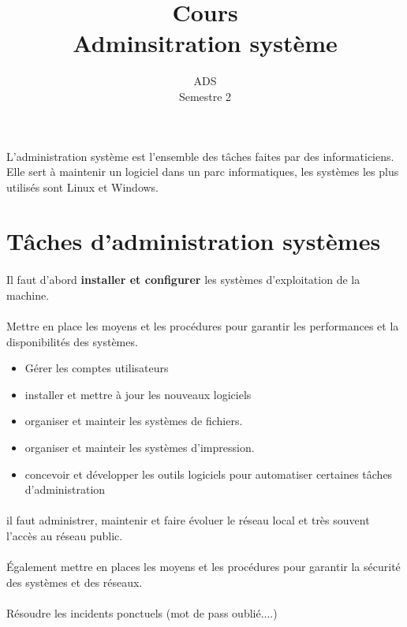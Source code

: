\documentclass[12pt,a4paper,openany]{book}
\title{Cours\\ Adminsitration système}
\date{ADS\\ Semestre 2}
\begin{document}
	\maketitle
	L'administration système est l'ensemble des tâches faites par des informaticiens.
	Elle sert à maintenir un logiciel dans un parc informatiques, les systèmes les 
	plus utilisés sont Linux et Windows.

	\section{Tâches d'administration systèmes}
		\paragraph{}
		Il faut d'abord \textbf{installer et configurer} les systèmes d'exploitation
			de la machine.
	\paragraph{}
	Mettre en place les moyens et les procédures pour garantir les performances
	et la disponibilités des systèmes. 
	\begin{itemize}
		\item Gérer les comptes utilisateurs
		\item installer et mettre à jour les nouveaux logiciels
		\item organiser et mainteir les systèmes de fichiers.
		\item organiser et mainteir les systèmes d'impression.
		\item concevoir et développer les outils logiciels pour automatiser
			certaines tâches d'administration
	\end{itemize}
	\paragraph{}
		il faut administrer, maintenir et faire évoluer le réseau local et très
		souvent l'accès au réseau public.
	\paragraph{}
		Également mettre en places les moyens et les procédures pour garantir la 
		sécurité des systèmes et des réseaux.
	\paragraph{}
		Résoudre les incidents ponctuels (mot de pass oublié....)
\end{document}
